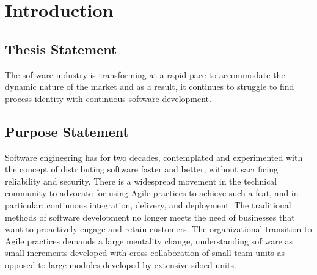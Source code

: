 \documentclass[11pt,a4paper]{article}
\begin{document}

\newpage

\section{Introduction}

\subsection{Thesis Statement}
The software industry is transforming at a rapid pace to accommodate the dynamic nature of the market and as a result, it continues to struggle to find process-identity with continuous software development.

\subsection{Purpose Statement}
Software engineering has for two decades, contemplated and experimented with the concept of distributing software faster and better, without sacrificing reliability and security. There is a widespread movement in the technical community to advocate for using Agile practices to achieve such a feat, and in particular: continuous integration, delivery, and deployment. The traditional methods of software development no longer meets the need of businesses that want to proactively engage and retain customers. The organizational transition to Agile practices demands a large mentality change, understanding software as small increments developed with cross-collaboration of small team units as opposed to large modules developed by extensive siloed units.
\end{document}
